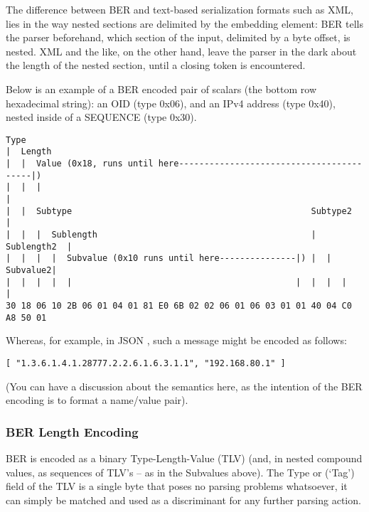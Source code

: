 The difference between BER and text-based serialization formats such as 
XML, lies in the way nested sections are delimited by the embedding 
element: BER tells the parser beforehand, which section of the input, 
delimited by a byte offset, is nested. XML and the like, on the other 
hand, leave the parser in the dark about the length of the nested section, 
until a closing token is encountered.

Below is an example of a BER encoded pair of scalars
(the bottom row hexadecimal string): an
OID (type 0x06), and an IPv4 address (type 0x40), nested inside of
a SEQUENCE (type 0x30).

\begin{changemargin}{-60mm}{0mm}
\begin{myquote}
\begin{verbatim}
Type
|  Length
|  |  Value (0x18, runs until here-----------------------------------------|)
|  |  |                                                                    |
|  |  Subtype                                               Subtype2       |
|  |  |  Sublength                                          |  Sublength2  |
|  |  |  |  Subvalue (0x10 runs until here---------------|) |  |  Subvalue2|
|  |  |  |  |                                            |  |  |  |        |
30 18 06 10 2B 06 01 04 01 81 E0 6B 02 02 06 01 06 03 01 01 40 04 C0 A8 50 01
\end{verbatim}
\end{myquote}
\end{changemargin}

Whereas, for example, in JSON \cite{bib:json},
such a message might be encoded as follows:

\begin{changemargin}{-60mm}{0mm}
\begin{myquote}
\begin{verbatim}
[ "1.3.6.1.4.1.28777.2.2.6.1.6.3.1.1", "192.168.80.1" ]
\end{verbatim}
\end{myquote}
\end{changemargin}

(You can have a discussion about the semantics here, as the intention of
the BER encoding is to format a name/value pair).

\subsubsection{BER Length Encoding}
BER is encoded as a binary Type-Length-Value (TLV) (and, in nested 
compound values, as sequences of TLV’s – as in the Subvalues above).
The Type or (‘Tag’) field of the TLV is a single byte that poses no 
parsing problems whatsoever, it can simply be matched and used as a 
discriminant for any further parsing action.

